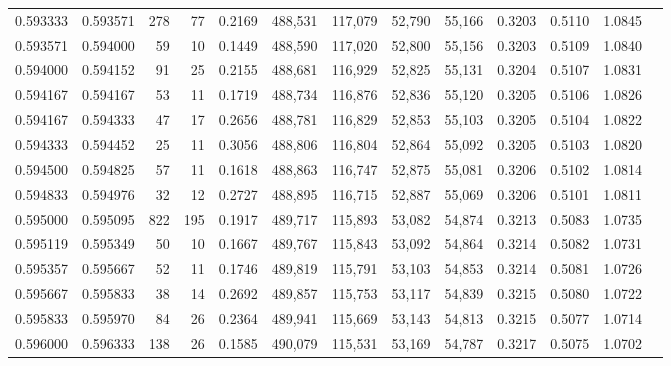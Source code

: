 \begin{tabular}{rrrrrrrrrrrrr}
0.593333 & 0.593571 &   278 &  77 &                                     0.2169 & 488,531 & 117,079 &  52,790 &  55,166 & 0.3203 & 0.5110 & 1.0845 \\
0.593571 & 0.594000 &    59 &  10 &                                     0.1449 & 488,590 & 117,020 &  52,800 &  55,156 & 0.3203 & 0.5109 & 1.0840 \\
0.594000 & 0.594152 &    91 &  25 &                                     0.2155 & 488,681 & 116,929 &  52,825 &  55,131 & 0.3204 & 0.5107 & 1.0831 \\
0.594167 & 0.594167 &    53 &  11 &                                     0.1719 & 488,734 & 116,876 &  52,836 &  55,120 & 0.3205 & 0.5106 & 1.0826 \\
0.594167 & 0.594333 &    47 &  17 &                                     0.2656 & 488,781 & 116,829 &  52,853 &  55,103 & 0.3205 & 0.5104 & 1.0822 \\
0.594333 & 0.594452 &    25 &  11 &                                     0.3056 & 488,806 & 116,804 &  52,864 &  55,092 & 0.3205 & 0.5103 & 1.0820 \\
0.594500 & 0.594825 &    57 &  11 &                                     0.1618 & 488,863 & 116,747 &  52,875 &  55,081 & 0.3206 & 0.5102 & 1.0814 \\
0.594833 & 0.594976 &    32 &  12 &                                     0.2727 & 488,895 & 116,715 &  52,887 &  55,069 & 0.3206 & 0.5101 & 1.0811 \\
0.595000 & 0.595095 &   822 & 195 &                                     0.1917 & 489,717 & 115,893 &  53,082 &  54,874 & 0.3213 & 0.5083 & 1.0735 \\
0.595119 & 0.595349 &    50 &  10 &                                     0.1667 & 489,767 & 115,843 &  53,092 &  54,864 & 0.3214 & 0.5082 & 1.0731 \\
0.595357 & 0.595667 &    52 &  11 &                                     0.1746 & 489,819 & 115,791 &  53,103 &  54,853 & 0.3214 & 0.5081 & 1.0726 \\
0.595667 & 0.595833 &    38 &  14 &                                     0.2692 & 489,857 & 115,753 &  53,117 &  54,839 & 0.3215 & 0.5080 & 1.0722 \\
0.595833 & 0.595970 &    84 &  26 &                                     0.2364 & 489,941 & 115,669 &  53,143 &  54,813 & 0.3215 & 0.5077 & 1.0714 \\
0.596000 & 0.596333 &   138 &  26 &                                     0.1585 & 490,079 & 115,531 &  53,169 &  54,787 & 0.3217 & 0.5075 & 1.0702 \\

\end{tabular}
